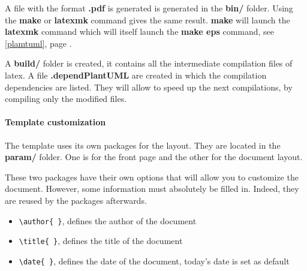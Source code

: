 A file with the format \textbf{.pdf} is generated is generated in the \textbf{bin/} folder.
Using the \textbf{make} or \textbf{latexmk} command gives the same result.
\textbf{make} will launch the \textbf{latexmk} command which will itself launch the
\textbf{make eps} command, see \ref{plamtuml}, page \pageref{plamtuml}.\newline

A \textbf{build/} folder is created, it contains all the intermediate compilation files of
\gls{latex}. A file \textbf{.dependPlantUML} are created in which the compilation dependencies are
listed. They will allow to speed up the next compilations, by compiling only the modified files.

\paragraph{Template customization}
The template uses its own packages for the layout.
They are located in the \textbf{param/} folder.
One is for the front page and the other for the document layout.

These two packages have their own options that will allow you to customize the document.
However, some information must absolutely be filled in. Indeed, they are reused by the packages
afterwards.
\begin{itemize}
    \item \verb=\author{ }=, defines the author of the document
    \item \verb=\title{ }=, defines the title of the document
    \item \verb=\date{ }=, defines the date of the document, today's date is set as default
\end{itemize}

